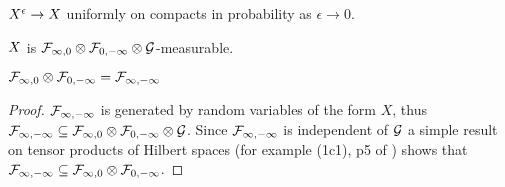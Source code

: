 {\begin{lemma}
  $X^{\epsilon} \to X$ uniformly on compacts in probability as $\epsilon \to 0$.
\end{lemma}

\begin{cor}
  $X$ is $\mathcal{F}_{\infty,0} \otimes \mathcal{F}_{0,-\infty} \otimes \mathcal{G}$-measurable.
\end{cor}

\begin{theorem}
  $\mathcal{F}_{\infty,0} \otimes \mathcal{F}_{0,-\infty} = \mathcal{F}_{\infty,-\infty}$
\end{theorem}

\begin{proof}
  $\mathcal{F}_{\infty,-\infty}$ is generated by random variables of the form $X$, thus
  $\mathcal{F}_{\infty,-\infty} \subseteq \mathcal{F}_{\infty,0} \otimes \mathcal{F}_{0,-\infty} \otimes \mathcal{G}$.  Since $\mathcal{F}_{\infty,-\infty}$ is
  independent of $\mathcal{G}$ a simple result on tensor products of
  Hilbert spaces (for example (1c1), p5 of
  \cite{tsirelson-completion}) shows
  that $\mathcal{F}_{\infty,-\infty} \subseteq \mathcal{F}_{\infty,0} \otimes \mathcal{F}_{0,-\infty}$.
\end{proof}
}

